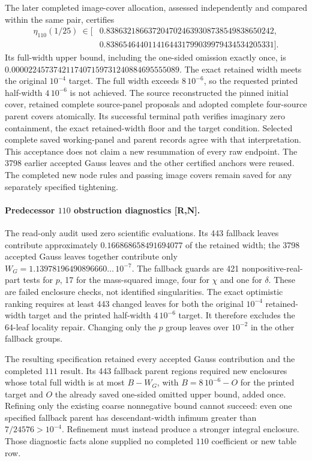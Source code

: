 \documentclass[10pt]{article}
\begin{document}
The later completed image-cover allocation, assessed independently
and compared within the same pair, certifies
\[
\boxed{\begin{aligned}
\eta_{110}(1/25)\ \in[
&0.8386321866372047024639308738549838650242,\\
&0.8386546440114164431799039979434534205331].
\end{aligned}}                                                \tag{7}
\]
Its full-width upper bound, including the one-sided omission
exactly once, is
$0.0000224573742117407159731240884695555089$.
The exact retained width meets the original $10^{-4}$ target.
The full width exceeds $8\,10^{-6}$, so the requested printed
half-width $4\,10^{-6}$ is not achieved.
The source reconstructed the pinned initial cover, retained
complete source-panel proposals and adopted complete four-source
parent covers atomically. Its successful terminal path verifies
imaginary zero containment, the exact retained-width floor and
the target condition. Selected complete saved working-panel and
parent records agree with that interpretation. This acceptance
does not claim a new resummation of every raw endpoint.
The 3798 earlier accepted Gauss leaves and the other certified
anchors were reused. The completed new node rules and passing
image covers remain saved for any separately specified tightening.

\paragraph{Predecessor $110$ obstruction diagnostics [R,N].}
The read-only audit used zero scientific evaluations. Its 443
fallback leaves contribute approximately
$0.166868658491694077$ of the retained width; the 3798 accepted
Gauss leaves together contribute only
$W_G=1.13978196490896660\ldots\,10^{-7}$.
The fallback guards are 421 nonpositive-real-part tests for $p$,
17 for the mass-squared image, four for $\chi$ and one for $\delta$.
These are failed enclosure checks, not identified singularities.
The exact optimistic ranking requires at least 443 changed leaves
for both the original $10^{-4}$ retained-width target and the
printed half-width $4\,10^{-6}$ target. It therefore excludes the
64-leaf locality repair. Changing only the $p$ group leaves over
$10^{-2}$ in the other fallback groups.

The resulting specification retained every accepted Gauss
contribution and the completed $111$ result. Its 443 fallback
parent regions required new
enclosures whose total full width is at most $B-W_G$, with
$B=8\,10^{-6}-O$ for the printed target and $O$ the already saved
one-sided omitted upper bound, added once. Refining only the
existing coarse nonnegative bound cannot succeed: even one
specified fallback parent has descendant-width infimum greater
than $7/24576>10^{-4}$. Refinement must instead produce a
stronger integral enclosure. Those diagnostic facts alone
supplied no completed $110$ coefficient or new table row.
\end{document}
